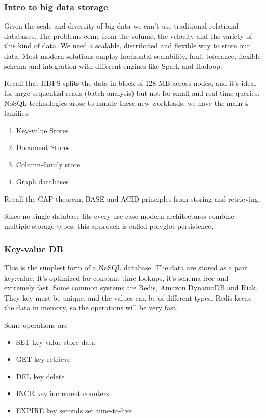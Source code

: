 \subsubsection{Intro to big data storage}

Given the scale and diversity of big data we can't use traditional relational databases. The problems come from the volume, the velocity and the variety of this kind of data. We need a scalable, distributed and flexible way to store our data. Most modern solutions employ horizontal scalability, fault tolerance, flexible schema and integration with different engines like Spark and Hadoop. 

\vspace{10pt}

Recall that HDFS splits the data in block of 128 MB across nodes, and it's ideal for large sequential reads (batch analysis) but not for small and real-time queries. NoSQL technologies arose to handle these new workloads, we have the main 4 families:

\begin{enumerate}
    \item Key-value Stores
    \item Document Stores
    \item Column-family store
    \item Graph databases
\end{enumerate}

Recall the CAP theorem, BASE and ACID principles from storing and retrieving. 

\vspace{10pt}

Since no single database fits every use case modern architectures combine multiple storage types, this approach is called polyglot persistence. 


\subsubsection{Key-value DB}


This is the simplest form of a NoSQL database. The data are stored as a pair key:value. It's optimized for constant-time lookups, it's schema-free and extremely fast. Some common systems are Redis, Amazon DynamoDB and Riak. They key must be unique, and the values can be of different types. Redis keeps the data in memory, so the operations will be very fast. 

Some operations are 

\begin{itemize}
    \item SET key value \ra store data
    \item GET key \ra retrieve
    \item DEL key \ra delete
    \item INCR key \ra increment counters
    \item EXPIRE key seconds \ra set time-to-live 
\end{itemize}


